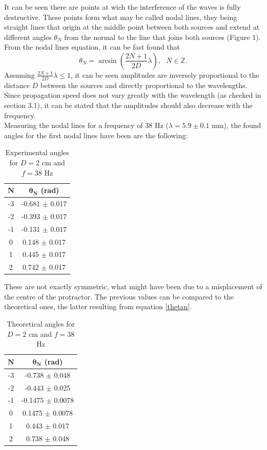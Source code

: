 \documentclass[a4paper, 12pt]{article}
\begin{document}
	It can be seen there are points at wich the interference of the waves is fully destructive. These points form what may be called nodal lines, they being straight lines that origin at the middle point between both sources and extend at different angles $\theta_N$ from the normal to the line that joins both sources (Figure 1). From the nodal lines equation, it can be fast found that \begin{equation}\label{thetan}
		\theta_N = \arcsin\left(\frac{2N + 1}{2 D} \lambda \right), \mbox{ } N \in \mathbb{Z}.
	\end{equation}
	Assuming $\frac{2N + 1}{2D}\lambda \leq 1$, it can be seen amplitudes are inversely proportional to the distance $D$ between the sources and directly proportional to the wavelengths. Since propagation speed does not vary greatly with the wavelength (as checked in section 3.1), it can be stated that the amplitudes should also decrease with the frequency. \\
	
	Measuring the nodal lines for a frequency of 38 Hz ($\lambda = 5.9 \pm 0.1 $ mm), the found angles for the first nodal lines have been are the following:
	\begin{table}[hbt!]
		\centering
		\begin{tabular}{|c|c|}
			\hline
			$\boldsymbol{N}$ & $\boldsymbol{\theta_N}$ \textbf{(rad)} \\
			\hline
			-3 & -0.681 $\pm$ 0.017 \\
			-2 & -0.393 $\pm$ 0.017 \\
			-1 & -0.131 $\pm$ 0.017 \\
			0 & 0.148 $\pm$ 0.017 \\
			1 & 0.445 $\pm$ 0.017 \\
			2 & 0.742 $\pm$ 0.017 \\
			\hline
		\end{tabular}
		\caption{Experimental angles for $D = 2$ cm and $f = 38$ Hz}
	\end{table}
	
	These are not exactly symmetric, what might have been due to a misplacement of the centre of the protractor. The previous values can be compared to the theoretical ones, the latter resulting from equation \ref{thetan}.
	\begin{table}[hbt!]
		\centering
		\begin{tabular}{|c|c|}
			\hline
			$\boldsymbol{N}$ & $\boldsymbol{\theta_N}$ \textbf{(rad)} \\
			\hline
			-3 & -0.738 $\pm$ 0.048 \\
			-2 & -0.443 $\pm$ 0.025 \\
			-1 & -0.1475 $\pm$ 0.0078 \\
			0 & 0.1475 $\pm$ 0.0078 \\
			1 & 0.443 $\pm$ 0.017 \\
			2 & 0.738 $\pm$ 0.048 \\
			\hline
		\end{tabular}
		\caption{Theoretical angles for $D = 2$ cm and $f = 38$ Hz}
	\end{table}
\end{document}
